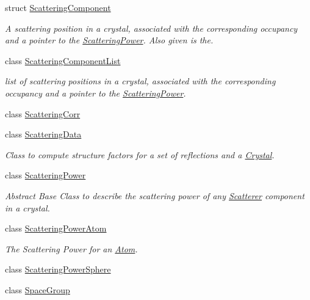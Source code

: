 \begin{DoxyCompactItemize}
struct \mbox{\hyperlink{struct_obj_cryst_1_1_scattering_component}{Scattering\+Component}}
\begin{DoxyCompactList}\small\item\em A scattering position in a crystal, associated with the corresponding occupancy and a pointer to the \mbox{\hyperlink{class_obj_cryst_1_1_scattering_power}{Scattering\+Power}}. Also given is the. \end{DoxyCompactList}\item 
class \mbox{\hyperlink{class_obj_cryst_1_1_scattering_component_list}{Scattering\+Component\+List}}
\begin{DoxyCompactList}\small\item\em list of scattering positions in a crystal, associated with the corresponding occupancy and a pointer to the \mbox{\hyperlink{class_obj_cryst_1_1_scattering_power}{Scattering\+Power}}. \end{DoxyCompactList}\item 
class \mbox{\hyperlink{class_obj_cryst_1_1_scattering_corr}{Scattering\+Corr}}
\item 
class \mbox{\hyperlink{class_obj_cryst_1_1_scattering_data}{Scattering\+Data}}
\begin{DoxyCompactList}\small\item\em Class to compute structure factors for a set of reflections and a \mbox{\hyperlink{class_obj_cryst_1_1_crystal}{Crystal}}. \end{DoxyCompactList}\item 
class \mbox{\hyperlink{class_obj_cryst_1_1_scattering_power}{Scattering\+Power}}
\begin{DoxyCompactList}\small\item\em Abstract Base Class to describe the scattering power of any \mbox{\hyperlink{class_obj_cryst_1_1_scatterer}{Scatterer}} component in a crystal. \end{DoxyCompactList}\item 
class \mbox{\hyperlink{class_obj_cryst_1_1_scattering_power_atom}{Scattering\+Power\+Atom}}
\begin{DoxyCompactList}\small\item\em The Scattering Power for an \mbox{\hyperlink{class_obj_cryst_1_1_atom}{Atom}}. \end{DoxyCompactList}\item 
class \mbox{\hyperlink{class_obj_cryst_1_1_scattering_power_sphere}{Scattering\+Power\+Sphere}}
\item 
class \mbox{\hyperlink{class_obj_cryst_1_1_space_group}{Space\+Group}}

\end{DoxyCompactItemize}
